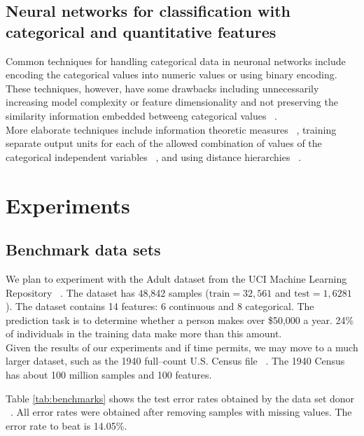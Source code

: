 \documentclass[10pt,twocolumn,letterpaper]{article}
\begin{document}
\subsection{Neural networks for classification with categorical and
quantitative features}  Common techniques for handling categorical data in
neuronal networks include encoding the categorical values into numeric values
or using binary encoding. These techniques, however, have some drawbacks
including unnecessarily increasing model complexity or feature dimensionality
and not preserving the similarity information embedded betweeng categorical
values ~\cite{hsu2006generalizing}.\\

More elaborate techniques include information theoretic measures
~\cite{wang2008categorical}, training separate output units for
each of the allowed combination of values of the categorical independent
variables ~\cite{brouwer2002feed}, and using distance
hierarchies ~\cite{hsu2006generalizing}.

\section{Experiments} \label{section:Experiments}

\subsection{Benchmark data sets}

We plan to experiment with the Adult dataset from the UCI Machine Learning Repository ~\cite{Lichman2013}. The dataset has 48,842 samples ($\mathrm{train}=32,561$ and $\mathrm{test}=1,6281$). The dataset contains 14 features: 6 continuous and 8 categorical. The prediction task is to determine whether a person makes over \$50,000 a year. 24\% of individuals in the training data make more than this amount. \\

Given the results of our experiments and if time permits, we may move to a much larger dataset, such as the 1940 full--count U.S. Census file ~\cite{napp2008, ruggles2010}. The 1940 Census has about 100 million samples and 100 features. 

Table \ref{tab:benchmarks} shows the test error rates obtained by the data set donor ~\cite{kohavi1996}. All error rates were obtained after removing samples with missing values. The error rate to beat is 14.05\%. \\
\end{document}

